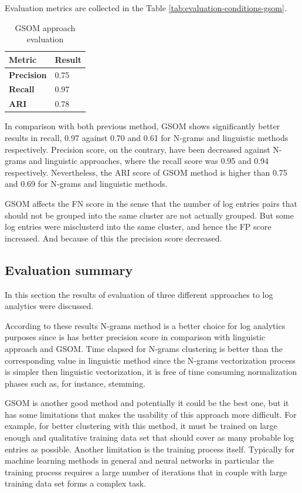 \documentclass[thesis=M,english]{FITthesis}[2019/12/23]
\begin{document}
Evaluation metrics are collected in the Table \ref{tab:evaluation-conditions-gsom}.

\begin{table}[h!]\centering
	\caption{GSOM approach evaluation}\label{tab:gsom-evaluation}
	\begin{tabular}{ |m{9em}|m{4em}| }
		\hline
		\textbf{Metric} & \textbf{Result}\\
		\hline
		\textbf{Precision} & 0.75 \\
		\hline
		\textbf{Recall} & 0.97 \\
		\hline
		\textbf{ARI} & 0.78 \\
		\hline
	\end{tabular}
\end{table}

In comparison with both previous method, GSOM shows significantly better results in recall, 0.97 against 0.70 and 0.61 for N-grams and linguistic methods respectively. Precision score, on the contrary, have been decreased against N-grams and linguistic approaches, where the recall score was 0.95 and 0.94 respectively. Nevertheless, the ARI score of GSOM method is higher than 0.75 and 0.69 for N-grams and linguistic methods.

GSOM affects the FN score in the sense that the number of log entries pairs that should not be grouped into the same cluster are not actually grouped. But some log entries were misclusterd into the same cluster, and hence the FP score increased. And because of this the precision score decreased.


\subsection{Evaluation summary}
In this section the results of evaluation of three different approaches to log analytics were discussed.

According to these results N-grams method is a better choice for log analytics purposes since is has better precision score in comparison with linguistic approach and GSOM. Time elapsed for N-grams clustering is better than the corresponding value in linguistic method since the N-grams vectorization process is simpler then linguistic vectorization, it is free of time consuming normalization phases such as, for instance, stemming. %

GSOM is another good method and potentially it could be the best one, but it has some limitations that makes the usability of this approach more difficult. For example, for better clustering with this method, it must be trained on large enough and qualitative training data set that should cover as many probable log entries as possible. Another limitation is the training process itself. Typically for machine learning methods in general and neural networks in particular the training process requires a large number of iterations that in couple with large training data set forms a complex task.
\end{document}
